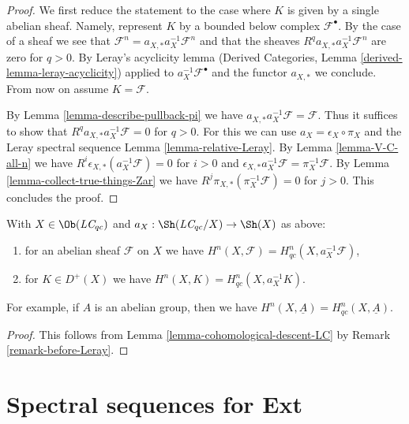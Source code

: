 \begin{proof}
We first reduce the statement to the case where
$K$ is given by a single abelian sheaf. Namely, represent $K$
by a bounded below complex $\mathcal{F}^\bullet$. By the case of a
sheaf we see that
$\mathcal{F}^n = a_{X, *} a_X^{-1} \mathcal{F}^n$
and that the sheaves $R^qa_{X, *}a_X^{-1}\mathcal{F}^n$
are zero for $q > 0$. By Leray's acyclicity lemma
(Derived Categories, Lemma \ref{derived-lemma-leray-acyclicity})
applied to $a_X^{-1}\mathcal{F}^\bullet$
and the functor $a_{X, *}$ we conclude. From now on assume $K = \mathcal{F}$.

\medskip\noindent
By Lemma \ref{lemma-describe-pullback-pi} we have
$a_{X, *}a_X^{-1}\mathcal{F} = \mathcal{F}$. Thus it suffices to show that
$R^qa_{X, *}a_X^{-1}\mathcal{F} = 0$ for $q > 0$.
For this we can use $a_X = \epsilon_X \circ \pi_X$ and
the Leray spectral sequence Lemma \ref{lemma-relative-Leray}.
By Lemma \ref{lemma-V-C-all-n}
we have $R^i\epsilon_{X, *}(a_X^{-1}\mathcal{F}) = 0$ for $i > 0$
and $\epsilon_{X, *}a_X^{-1}\mathcal{F} = \pi_X^{-1}\mathcal{F}$.
By Lemma \ref{lemma-collect-true-things-Zar} we have
$R^j\pi_{X, *}(\pi_X^{-1}\mathcal{F}) = 0$ for $j > 0$.
This concludes the proof.
\end{proof}

\begin{lemma}
\label{lemma-compare-cohomology-LC}
With $X \in \Ob(\textit{LC}_{qc})$ and
$a_X : \Sh(\textit{LC}_{qc}/X) \to \Sh(X)$ as above:
\begin{enumerate}
\item for an abelian sheaf $\mathcal{F}$ on $X$ we have
$H^n(X, \mathcal{F}) = H^n_{qc}(X, a_X^{-1}\mathcal{F})$,
\item for $K \in D^+(X)$ we have $H^n(X, K) = H^n_{qc}(X, a_X^{-1}K)$.
\end{enumerate}
For example, if $A$ is an abelian group, then we have
$H^n(X, \underline{A}) = H^n_{qc}(X, \underline{A})$.
\end{lemma}

\begin{proof}
This follows from Lemma \ref{lemma-cohomological-descent-LC}
by Remark \ref{remark-before-Leray}.
\end{proof}











\section{Spectral sequences for Ext}
\label{section-spectral-sequence-ext}


